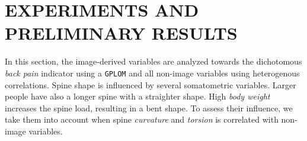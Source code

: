 \documentclass[a4paper,twoside]{style/article}
\begin{document}
\section{\uppercase{Experiments and Preliminary Results}}
\label{sec:Experiments}
\noindent In this section, the image-derived variables are analyzed towards the dichotomous \emph{back pain} indicator using a \texttt{GPLOM} and all non-image variables using heterogenous correlations.
Spine shape is influenced by several somatometric variables.
Larger people have also a longer spine with a straighter shape.
High \emph{body weight} increases the spine load, resulting in a bent shape.
To assess their influence, we take them into account when spine \emph{curvature} and \emph{torsion} is correlated with non-image variables.
\end{document}
